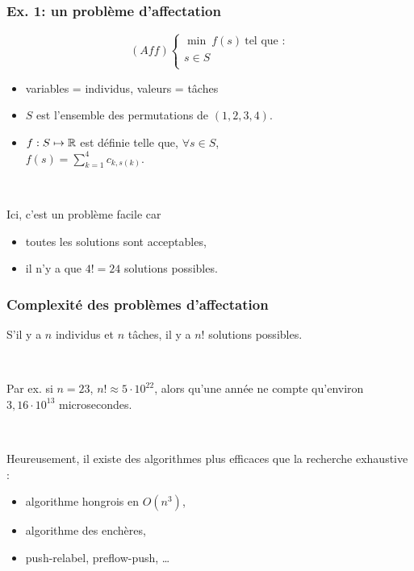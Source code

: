 \documentclass{beamer}
\newcommand{\R}{{\ensuremath\mathbb{R}}}
\begin{document}
\begin{frame}
  \frametitle{Ex. 1: un problème d'affectation}

  \[
  (Aff) \left\{
  \begin{array}{c}
    \min \ f(s) \ \text{tel que :} \\
    s \in S \\
  \end{array}
  \right.
  \]

  \begin{itemize}
  \item variables = individus, valeurs = tâches
  \item $S$ est l'ensemble des permutations de $(1,2,3,4)$. 
  \item $f : S \mapsto \R$ est définie telle que, $\forall s \in S$, \\
    $f(s) = \sum_{k=1}^4 c_{k,s(k)}$.  
  \end{itemize}

  ~
  
  Ici, c'est un problème facile car
  \begin{itemize}
  \item toutes les solutions sont acceptables,
  \item il n'y a que $4! = 24$ solutions possibles. 
  \end{itemize}

\end{frame}

\begin{frame}
  \frametitle{Complexité des problèmes d'affectation}

  S'il y a $n$ individus et $n$ tâches,
  il y a $n!$ solutions possibles. 

  ~
  
  Par ex. si $n = 23$, $n! \approx 5 \cdot 10^{22}$, alors qu'une
  année ne compte qu'environ $3,16 \cdot 10^{13}$ microsecondes.

  ~
  
  Heureusement, il existe des algorithmes plus efficaces
  que la recherche exhaustive :
  \begin{itemize}
  \item algorithme hongrois en $O(n^3)$,
  \item algorithme des enchères,
  \item push-relabel, preflow-push, \dots
  \end{itemize}
  
\end{frame}
\end{document}
